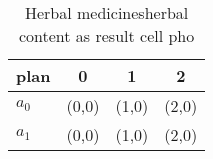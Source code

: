 \documentclass[a4paper]{article}
\begin{document}
\begin{table}
\begin{adjustbox}{width=0.6\columnwidth}
\begin{tabular}{|l|l|l|l|}
\hline
\textbf{plan} & \multicolumn{1}{c|}{\textbf{0}} & \multicolumn{1}{c|}{\textbf{1}} & \multicolumn{1}{c|}{\textbf{2}} \\ \hline
\textbf{$a_0$}  & (0,0) & (1,0) & (2,0) \\ \hline
\textbf{$a_1$}  & (0,0) & (1,0) & (2,0) \\ \hline
\end{tabular}
\end{adjustbox}
\caption{Herbal medicinesherbal content as result cell pho
}
\end{table}
\end{document}
